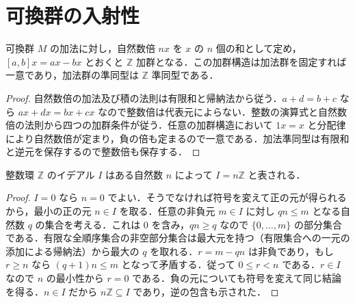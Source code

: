 \section{可換群の入射性}
\begin{prop}[可換群と整数加群]
可換群 $M$ の加法に対し，自然数倍 $nx$ を $x$ の $n$ 個の和として定め，$[a,b]x=ax-bx$ とおくと $\mathbb Z$ 加群となる．この加群構造は加法群を固定すれば一意であり，加法群の準同型は $\mathbb Z$ 準同型である．
\end{prop}
\begin{proof}
自然数倍の加法及び積の法則は有限和と帰納法から従う．$a+d=b+c$ なら $ax+dx=bx+cx$ なので整数倍は代表元によらない．整数の演算式と自然数倍の法則から四つの加群条件が従う．任意の加群構造において $1x=x$ と分配律により自然数倍が定まり，負の倍も定まるので一意である．加法準同型は有限和と逆元を保存するので整数倍も保存する．
\end{proof}
\begin{prop}[整数環のイデアルの生成]
整数環 $\mathbb Z$ のイデアル $I$ はある自然数 $n$ によって $I=n\mathbb Z$ と表される．
\end{prop}
\begin{proof}
$I=0$ なら $n=0$ でよい．そうでなければ符号を変えて正の元が得られるから，最小の正の元 $n\in I$ を取る．任意の非負元 $m\in I$ に対し $qn\leq m$ となる自然数 $q$ の集合を考える．これは $0$ を含み，$qn\geq q$ なので $\{0,\ldots,m\}$ の部分集合である．有限な全順序集合の非空部分集合は最大元を持つ（有限集合への一元の添加による帰納法）から最大の $q$ を取れる．$r=m-qn$ は非負であり，もし $r\geq n$ なら $(q+1)n\leq m$ となって矛盾する．従って $0\leq r<n$ である．$r\in I$ なので $n$ の最小性から $r=0$ である．負の元についても符号を変えて同じ結論を得る．$n\in I$ だから $n\mathbb Z\subseteq I$ であり，逆の包含も示された．
\end{proof}
